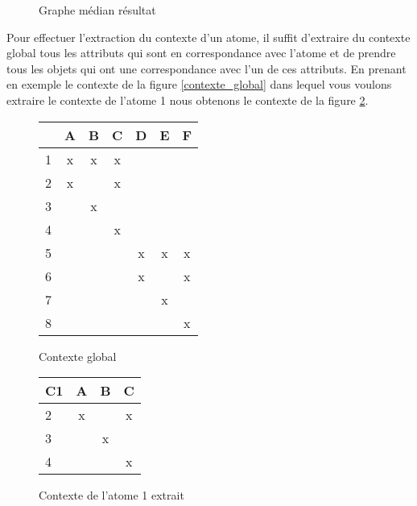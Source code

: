 \begin{figure}[H]
\begin{minipage}[c]{0.5 \textwidth}
\begin{center}
	\end{center}
	\caption{Graphe médian résultat}
	\label{priss_graphe_median}
	\end{minipage}
\end{figure}

Pour effectuer l'extraction du contexte d'un atome, il suffit d'extraire du contexte global tous les attributs qui sont en correspondance avec l'atome et de prendre tous les objets qui ont une correspondance avec l'un de ces attributs. En prenant en exemple le contexte de la figure \ref{contexte_global} dans lequel vous voulons extraire le contexte de l'atome 1 nous obtenons le contexte de la figure \ref{contexte_extrait}.

\begin{figure}[H]
	\begin{minipage}[c]{0.5\textwidth}
	\begin{center}
		\begin{tabular}{ l | c c c c c c }
			 & A & B & C & D & E & F \\
			\hline
			1 & x & x & x & & & \\
			2 & x & & x & & & \\
			3 & & x & & & & \\
			4 & & & x & & & \\
			5 & & & & x & x & x \\
			6 & & & & x & & x \\
			7 & & & & & x & \\
			8 & & & & & & x \\
		\end{tabular}
	\end{center}
	\caption{Contexte global}
	\label{contexte_global}
	\end{minipage}
	\begin{minipage}[c]{0.5\textwidth}
	\begin{center}
		\begin{tabular}{ l | c c c }
			C1 & A & B & C \\
			\hline
			2 & x & & x \\
			3 & & x & \\
			4 & & & x \\
		\end{tabular}
	\end{center}
	\caption{Contexte de l'atome 1 extrait}
	\label{contexte_extrait}
	\end{minipage}
\end{figure}

